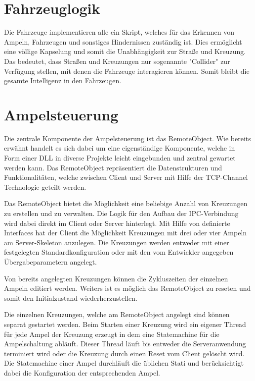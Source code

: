 \section{Fahrzeuglogik}
\label{Fahrzeuglogik}

Die Fahrzeuge implementieren alle ein Skript, welches für das Erkennen von Ampeln, Fahrzeugen und sonstiges Hindernissen zuständig ist. Dies ermöglicht eine völlige Kapselung und somit die Unabhängigkeit zur Straße und Kreuzung. Das bedeutet, dass Straßen und Kreuzungen nur sogenannte "Collider" zur Verfügung stellen, mit denen die Fahrzeuge interagieren können. Somit bleibt die gesamte Intelligenz in den Fahrzeugen.

\section{Ampelsteuerung}

Die zentrale Komponente der Ampelsteuerung ist das RemoteObject. Wie bereits erwähnt handelt es sich dabei um eine eigenständige Komponente, welche in Form einer DLL in diverse Projekte leicht eingebunden und zentral gewartet werden kann. Das RemoteObject repräsentiert die Datenstrukturen und Funktionalitäten, welche zwischen Client und Server mit Hilfe der TCP-Channel Technologie geteilt werden.

Das RemoteObject bietet die Möglichkeit eine beliebige Anzahl von Kreuzungen zu erstellen und zu verwalten. Die Logik für den Aufbau der IPC-Verbindung wird dabei direkt im Client oder Server hinterlegt. Mit Hilfe von definierte Interfaces hat der Client die Möglichkeit Kreuzungen mit drei oder vier Ampeln am Server-Skeleton anzulegen. Die Kreuzungen werden entweder mit einer festgelegten Standardkonfiguration oder mit den vom Entwickler angegeben Übergabeparametern angelegt.

Von bereits angelegten Kreuzungen können die Zykluszeiten der einzelnen Ampeln editiert werden. Weiters ist es möglich das RemoteObject zu reseten und somit den Initialzustand wiederherzustellen.

Die einzelnen Kreuzungen, welche am RemoteObject angelegt sind können separat gestartet werden. Beim Starten einer Kreuzung wird ein eigener Thread für jede Ampel der Kreuzung erzeugt in dem eine Statemachine für die Ampelschaltung abläuft. Dieser Thread läuft bis entweder die Serveranwendung terminiert wird oder die Kreuzung durch einen Reset vom Client gelöscht wird. Die Statemachine einer Ampel durchläuft die üblichen Stati und berücksichtigt dabei die Konfiguration der entsprechenden Ampel. 

